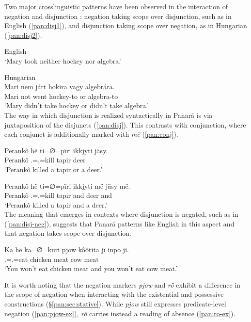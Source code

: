 \documentclass[output=paper,colorlinks,citecolor=brown,draft]{langscibook}
\begin{document}
Two major crosslinguistic patterns have been observed in the interaction of negation and disjunction \citep{Szabolcsi2004}: negation taking scope over disjunction, such as in English (\ref{pan:disj1}), and disjunction taking scope over negation, as in Hungarian (\ref{pan:disj2}).

\ea\label{pan:disj1}English \citep[219]{Szabolcsi-Haddican2004}
     \\
    {`Mary took neither hockey nor algebra.'} \\
\z

\ea\label{pan:disj2}Hungarian \citep[219]{Szabolcsi-Haddican2004}\\
    \gll Mari nem járt hokira vagy algebrára. \\
    Mari not went hockey-to or algebra-to \\
    \glt `Mary didn’t take hockey or didn’t take algebra.' \\ 
\z
The way in which disjunction is realized syntactically in Panará is via juxtaposition of the disjuncts (\ref{pan:disj}). This contrasts with conjunction, where each conjunct is additionally marked with \textit{më} (\ref{pan:conj}).

\ea\label{pan:disj}
    \gll Perankô hë ti=∅=pïri ikkjyti  jäsy. \\
    Perankô \Erg{} \Tsg.\Erg{}=\Tsg.\Abs{}=kill tapir  deer  \\
    \glt `Perankô killed a tapir or a deer.' \\
\z

\ea\label{pan:conj}
    \gll Perankô hẽ ti=∅=pïri ikkjyti më jäsy më. \\
    Perankô \Erg{} \Tsg.\Erg{}=\Tsg.\Abs{}=kill tapir and deer and \\
    \glt `Perankô killed a tapir and a deer.' \\
\z
The meaning that emerges in contexts where disjunction is negated, such as in (\ref{pan:disj-neg}), suggests that Panará patterns like English in this aspect and that negation takes scope over disjunction.

\ea\label{pan:disj-neg}
    \gll Ka hë ka=∅=kuri {pjow} kôôtita jï inpo jï. \\
    \Ssg{} \Erg{} \Tsg.\Erg{}=\Tsg.\Abs{}=eat \Neg{} chicken meat cow meat \\
    \glt `You won't eat chicken meat and you won't eat cow meat.'\\
\z

It is worth noting that the negation markers \textit{pjow} and \textit{rö} exhibit a difference in the scope of negation when interacting with the existential and possessive constructions (\S\ref{pan:sec:stative}). While \textit{pjow} still expresses predicate-level negation (\ref{pan:pjow-ex}), \textit{rö} carries instead a reading of absence (\ref{pan:ro-ex}).
\end{document}
